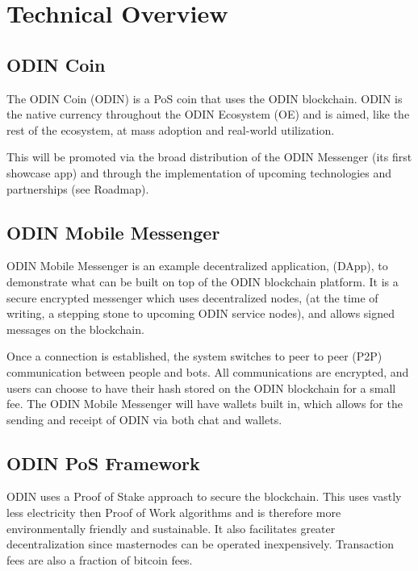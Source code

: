\documentclass[12pt,letterpaper]{article}
\begin{document}
\newpage

\section{​Technical Overview}

\subsection{ODIN Coin}
The ODIN Coin (ODIN) is a PoS coin that uses the ODIN blockchain. ODIN is the native currency throughout the ODIN Ecosystem (OE) and is aimed, like the rest of the ecosystem, at mass adoption and real-world utilization. 
 
This will be promoted via the broad distribution of the ODIN Messenger (its first showcase app) and through the implementation of upcoming technologies and partnerships (see Roadmap).

\subsection{ODIN Mobile Messenger}
ODIN Mobile Messenger is an example decentralized application, (DApp), to demonstrate what can be built on top of the ODIN blockchain platform. It is a secure encrypted messenger which uses decentralized nodes, (at the time of writing, a stepping stone to upcoming ODIN service nodes), and allows signed messages on the blockchain. 
 
Once a connection is established, the system switches to peer to peer (P2P) communication between people and bots. All communications are encrypted, and users can choose to have their hash stored on the ODIN blockchain for a small fee. The ODIN  Mobile Messenger will have wallets built in, which allows for the sending and receipt of ODIN via both chat and wallets. 

\subsection{ODIN PoS Framework}
ODIN uses a Proof of Stake approach to secure the blockchain. This uses vastly less electricity then Proof of Work algorithms and is therefore more environmentally friendly and sustainable. It also facilitates greater decentralization since masternodes can be operated inexpensively. Transaction fees are also a fraction of bitcoin fees.
\end{document}
